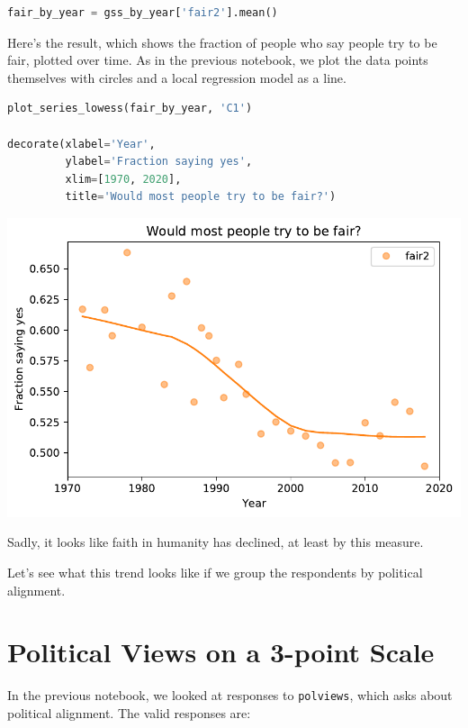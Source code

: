 \begin{lstlisting}[language=Python,style=source]
fair_by_year = gss_by_year['fair2'].mean()
\end{lstlisting}

Here's the result, which shows the fraction of people who say people try
to be fair, plotted over time. As in the previous notebook, we plot the
data points themselves with circles and a local regression model as a
line.

\begin{lstlisting}[language=Python,style=source]
plot_series_lowess(fair_by_year, 'C1')

decorate(xlabel='Year',
         ylabel='Fraction saying yes',
         xlim=[1970, 2020],
         title='Would most people try to be fair?')
\end{lstlisting}

\begin{center}
\includegraphics[scale=0.75]{03_outlook_files/03_outlook_32_0.pdf}
\end{center}

Sadly, it looks like faith in humanity has declined, at least by this
measure.

Let's see what this trend looks like if we group the respondents by
political alignment.

\hypertarget{political-views-on-a-3-point-scale}{%
\section{Political Views on a 3-point
Scale}\label{political-views-on-a-3-point-scale}}

In the previous notebook, we looked at responses to
\passthrough{\lstinline!polviews!}, which asks about political
alignment. The valid responses are:

